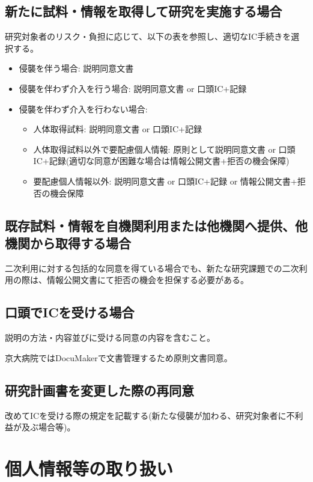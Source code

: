 \documentclass{kyodai-protocol}
\begin{document}
\subsection{新たに試料・情報を取得して研究を実施する場合}

研究対象者のリスク・負担に応じて、以下の表を参照し、適切なIC手続きを選択する。

\begin{itemize}
\item 侵襲を伴う場合: 説明同意文書
\item 侵襲を伴わず介入を行う場合: 説明同意文書 or 口頭IC+記録
\item 侵襲を伴わず介入を行わない場合:
  \begin{itemize}
  \item 人体取得試料: 説明同意文書 or 口頭IC+記録
  \item 人体取得試料以外で要配慮個人情報: 原則として説明同意文書 or 口頭IC+記録(適切な同意が困難な場合は情報公開文書+拒否の機会保障)
  \item 要配慮個人情報以外: 説明同意文書 or 口頭IC+記録 or 情報公開文書+拒否の機会保障
  \end{itemize}
\end{itemize}

\subsection{既存試料・情報を自機関利用または他機関へ提供、他機関から取得する場合}

二次利用に対する包括的な同意を得ている場合でも、新たな研究課題での二次利用の際は、情報公開文書にて拒否の機会を担保する必要がある。

\subsection{口頭でICを受ける場合}
説明の方法・内容並びに受ける同意の内容を含むこと。

京大病院ではDocuMakerで文書管理するため原則文書同意。

\subsection{研究計画書を変更した際の再同意}
改めてICを受ける際の規定を記載する(新たな侵襲が加わる、研究対象者に不利益が及ぶ場合等)。

\section{個人情報等の取り扱い}
\label{sec:privacy}
\end{document}
